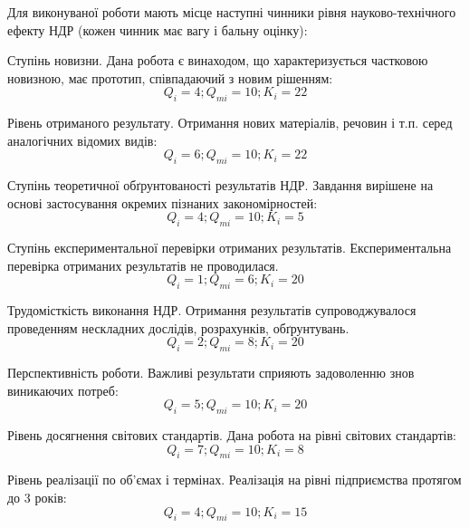 Для виконуваної роботи мають місце наступні чинники рівня науково-технічного ефекту НДР (кожен чинник має вагу і бальну оцінку):
\begin{longEnumerate}
\item Ступінь новизни. Дана робота є винаходом, що характеризується частковою новизною, має прототип, співпадаючий з новим рішенням:
\begin{equation}
Q_i = 4; Q_{mi} = 10; K_i = 22%
\end{equation}

\item Рівень отриманого результату. Отримання нових матеріалів, речовин і т.п. серед аналогічних відомих видів:
\begin{equation}
Q_i = 6; Q_{mi} = 10; K_i = 22%
\end{equation}

\item Ступінь теоретичної обґрунтованості результатів НДР. Завдання вирішене на основі застосування окремих пізнаних закономірностей:
\begin{equation}
Q_i = 4; Q_{mi} = 10; K_i = 5%
\end{equation}

\item Ступінь експериментальної перевірки отриманих результатів. Експериментальна перевірка отриманих результатів не проводилася.
\begin{equation}
Q_i = 1; Q_{mi} = 6; K_i = 20%
\end{equation}

\item Трудомісткість виконання НДР. Отримання результатів супроводжувалося проведенням нескладних дослідів, розрахунків, обґрунтувань.
\begin{equation}
Q_i = 2; Q_{mi} = 8; K_i = 20%
\end{equation}

\item Перспективність роботи. Важливі результати сприяють задоволенню знов виникаючих потреб:
\begin{equation}
Q_i = 5; Q_{mi} = 10; K_i = 20%
\end{equation}

\item Рівень досягнення світових стандартів. Дана робота на рівні світових стандартів:
\begin{equation}
Q_i = 7; Q_{mi} = 10; K_i = 8%
\end{equation}

\item Рівень реалізації по об'ємах і термінах. Реалізація на рівні підприємства протягом до 3 років:
\begin{equation}
Q_i = 4; Q_{mi} = 10; K_i = 15%
\end{equation}


\end{longEnumerate}
